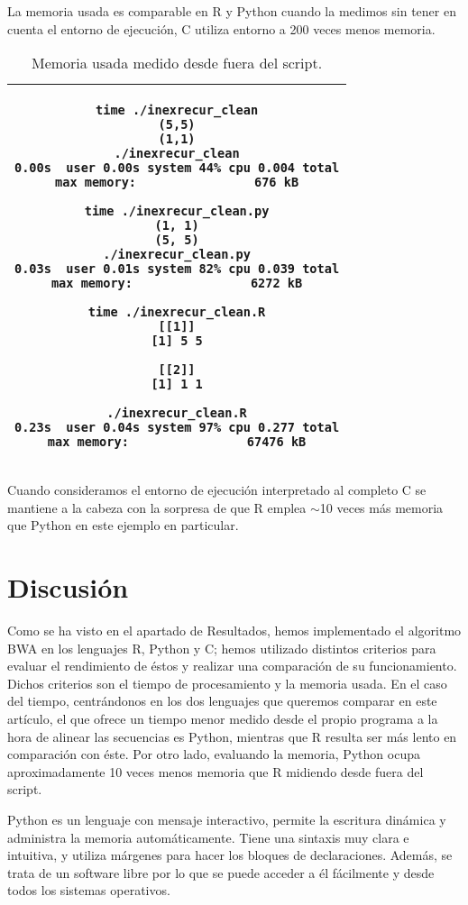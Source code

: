 \documentclass{article}
\newcommand{\tempcaption}{}
\newenvironment{codesnip}[1]{
\begin{table}[h!]
\gdef\tempcaption{#1}
\centering
\begin{tabular}{|c|}
\hline}
{\\\hline
\end{tabular}
\caption{\tempcaption}
\end{table}}
\newcommand{\C}{C }
\newcommand{\R}{R }
\newcommand{\python}{Python }
\begin{document}
La memoria usada es comparable en \R y \python cuando la medimos sin
tener en cuenta el entorno de ejecución, \C{} utiliza entorno a 200
veces menos memoria.

\vfill
\begin{codesnip}{Memoria usada medido desde fuera del script.}
\begin{lstlisting}
time ./inexrecur_clean
(5,5)
(1,1)
./inexrecur_clean
0.00s  user 0.00s system 44% cpu 0.004 total
max memory:                676 kB

time ./inexrecur_clean.py
(1, 1)
(5, 5)
./inexrecur_clean.py
0.03s  user 0.01s system 82% cpu 0.039 total
max memory:                6272 kB

time ./inexrecur_clean.R
[[1]]
[1] 5 5

[[2]]
[1] 1 1

./inexrecur_clean.R
0.23s  user 0.04s system 97% cpu 0.277 total
max memory:                67476 kB
\end{lstlisting}
\end{codesnip}

Cuando consideramos el entorno de ejecución interpretado al completo
\C{} se mantiene a la cabeza con la sorpresa de que \R emplea $\sim$10
veces más memoria que \python en este ejemplo en particular.

\section{Discusión}

Como se ha visto en el apartado de Resultados, hemos  implementado  el
algoritmo BWA  en  los	lenguajes  R,  Python  y  C;  hemos  utilizado
distintos criterios para evaluar el rendimiento de  éstos  y  realizar
una comparación de su funcionamiento.  Dichos criterios son el	tiempo
de  procesamiento  y  la  memoria  usada.   En	el  caso  del  tiempo,
centrándonos en los  dos  lenguajes  que  queremos  comparar  en  este
artículo, el que  ofrece  un  tiempo  menor  medido  desde  el	propio
programa a la hora de alinear las secuencias es Python, mientras que R
resulta ser más  lento	en  comparación  con  éste.   Por  otro  lado,
evaluando la memoria, Python  ocupa  aproximadamente  10  veces  menos
memoria que R midiendo desde fuera del script.

Python es un lenguaje con mensaje interactivo,	permite  la  escritura
dinámica y administra la memoria automáticamente.  Tiene una  sintaxis
muy clara e intuitiva, y utiliza márgenes para hacer  los  bloques  de
declaraciones.	Además, se trata de un software libre por  lo  que  se
puede acceder a él fácilmente y desde todos los  sistemas  operativos.
\cite{fangohr_2004}
\end{document}
